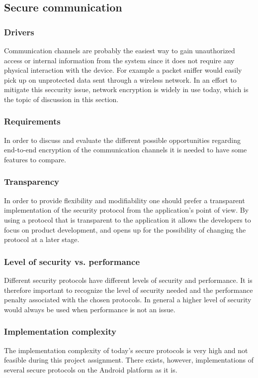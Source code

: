 \subsection{Secure communication}

\subsubsection{Drivers}
Communication channels are probably the easiest way to gain unauthorized access or internal information from the system since it does not require any physical interaction with the device.  For example a packet sniffer would easily pick up on unprotected data sent through a wireless network. In an effort to mitigate this seccurity issue, network encryption is widely in use today, which is the topic of discussion in this section.

\subsubsection{Requirements}
In order to discuss and evaluate the different possible opportunities regarding end-to-end encryption of the communication channels it is needed to have some features to compare.

\subsubsection{Transparency}
In order to provide flexibility and modifiability one should prefer a transparent implementation of the security protocol from the application’s point of view. By using a protocol that is transparent to the application it allows the developers to focus on product development, and opens up for the possibility of changing the protocol at a later stage.

\subsubsection{Level of security vs. performance}
Different security protocols have different levels of security and performance. It is therefore important to recognize the level of security needed and the performance penalty associated with the chosen protocols. In general a higher level of security would always be used when performance is not an issue.

\subsubsection{Implementation complexity}
The implementation complexity of today's secure protocols is very high and not feasible during this project assignment. There exists, however, implementations of several secure protocols on the Android platform as it is. 

